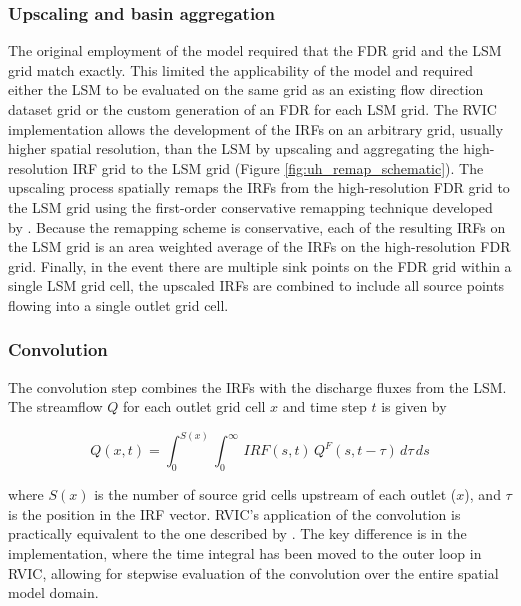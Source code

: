 \documentclass[jgrga, draft]{agutex}
\begin{document}
\begin{article}
\subsubsection{Upscaling and basin aggregation}
\label{sec:remap}

The original employment of the \citet{Lohmann_1996} model required that the FDR grid and the LSM grid match exactly.
This limited the applicability of the model and required either the LSM to be evaluated on the same grid as an existing flow direction dataset grid or the custom generation of an FDR for each LSM grid.
The RVIC implementation allows the development of the IRFs on an arbitrary grid, usually higher spatial resolution, than the LSM by upscaling and aggregating the high-resolution IRF grid to the LSM grid (Figure \ref{fig:uh_remap_schematic}).
The upscaling process spatially remaps the IRFs from the high-resolution FDR grid to the LSM grid using the first-order conservative remapping technique developed by \citet{Jones_1999}.
Because the remapping scheme is conservative, each of the resulting IRFs on the LSM grid is an area weighted average of the IRFs on the high-resolution FDR grid.
Finally, in the event there are multiple sink points on the FDR grid within a single LSM grid cell, the upscaled IRFs are combined to include all source points flowing into a single outlet grid cell.

\subsubsection{Convolution}
\label{sec:convolution}

The convolution step combines the IRFs with the discharge fluxes from the LSM.
The streamflow $Q$ for each outlet grid cell $x$ and time step $t$ is given by

\begin{equation}
  \label{eq:convolution}
   Q(x,t) = \int_0^{S(x)} \int_0^{\infty}\,IRF(s,t)\,Q^F(s,t-\tau)\,d\tau\,ds
 \end{equation}

where $S(x)$ is the number of source grid cells upstream of each outlet ($x$), and $\tau$ is the position in the IRF vector.
RVIC's application of the convolution is practically equivalent to the one described by \citet{Lohmann_1996}.
The key difference is in the implementation, where the time integral has been moved to the outer loop in RVIC, allowing for stepwise evaluation of the convolution over the entire spatial model domain.


\end{article}
\end{document}
